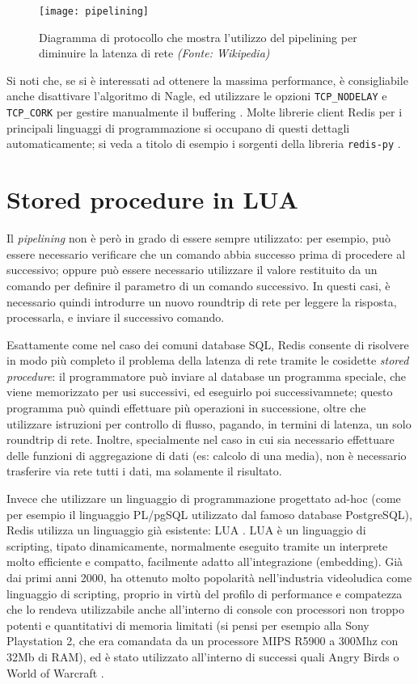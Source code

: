 \begin{figure}
	\centering
		\texttt{[image: pipelining]}
	\caption{Diagramma di protocollo che mostra l'utilizzo del pipelining per diminuire la latenza
	di rete \emph{(Fonte: Wikipedia)}}
\end{figure}

Si noti che, se si è interessati ad ottenere la massima performance, è consigliabile anche
disattivare l'algoritmo di Nagle, ed utilizzare le opzioni \verb|TCP_NODELAY| e \verb|TCP_CORK| per
gestire manualmente il buffering \cite{tcp-cork}. Molte librerie client Redis per i principali
linguaggi di programmazione si occupano di questi dettagli automaticamente; si veda a titolo di
esempio i sorgenti della libreria \verb|redis-py| \cite{tcp-cork-redispy}.

\section{Stored procedure in LUA}

Il \emph{pipelining} non è però in grado di essere sempre utilizzato: per esempio, può essere
necessario verificare che un comando abbia successo prima di procedere al successivo; oppure
può essere necessario utilizzare il valore restituito da un comando per definire il parametro 
di un comando successivo. In questi casi, è necessario quindi introdurre un nuovo roundtrip di
rete per leggere la risposta, processarla, e inviare il successivo comando.

Esattamente come nel caso dei comuni database SQL, Redis consente di risolvere in modo più completo
il problema della latenza di rete tramite le cosidette \emph{stored procedure}: il programmatore può
inviare al database un programma speciale, che viene memorizzato per usi successivi, ed eseguirlo
poi successivamnete; questo programma può quindi effettuare più operazioni in successione, oltre che
utilizzare istruzioni per controllo di flusso, pagando, in termini di latenza, un solo roundtrip di
rete. Inoltre, specialmente nel caso in cui sia necessario effettuare delle funzioni di aggregazione
di dati (es: calcolo di una media), non è necessario trasferire via rete tutti i dati, ma solamente
il risultato.

Invece che utilizzare un linguaggio di programmazione progettato ad-hoc (come per esempio il
linguaggio PL/pgSQL \cite{plpgsql} utilizzato dal famoso database PostgreSQL), Redis utilizza un
linguaggio già esistente: LUA \cite{lua}. LUA è un linguaggio di scripting, tipato dinamicamente,
normalmente eseguito tramite un interprete molto efficiente e compatto, facilmente adatto
all'integrazione (embedding). Già dai primi anni 2000, ha ottenuto molto popolarità nell'industria
videoludica come linguaggio di scripting, proprio in virtù del profilo di performance e compatezza
che lo rendeva utilizzabile anche all'interno di console con processori non troppo potenti e
quantitativi di memoria limitati (si pensi per esempio alla Sony Playstation 2, che era comandata da
un processore MIPS R5900 a 300Mhz con 32Mb di RAM), ed è stato utilizzato all'interno di successi
quali Angry Birds \cite{lua-angry} o World of Warcraft \cite{lua-wow}.

